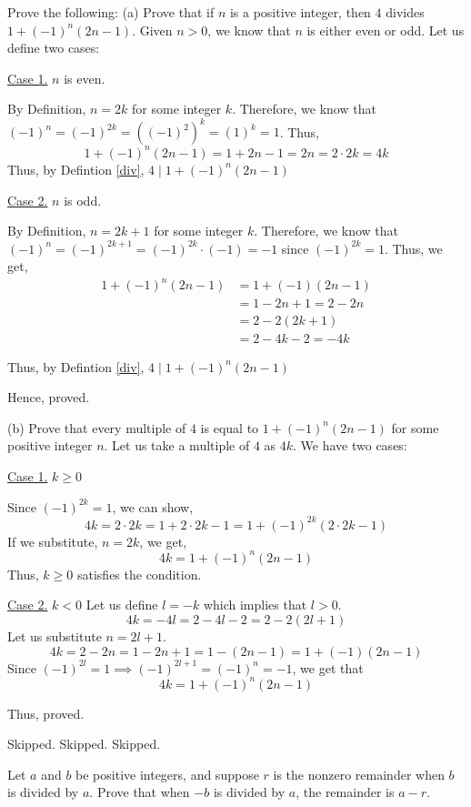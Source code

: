 \bp 
	Prove the following:
	\bigbreak
	(a) Prove that if $n$ is a positive integer, then $4$ divides $1 + (-1)^n(2n-1)$.
	\bs
		Given $n > 0$, we know that $n$ is either even or odd. Let us define two cases:

		\underline{Case 1.} $n$ is even.

		By Definition, $n = 2k$ for some integer $k$. 
		Therefore, we know that $(-1)^n = (-1)^{2k} = ((-1)^2)^k = (1)^k = 1$. Thus, 
		$$1 + (-1)^n(2n-1) = 1 + 2n-1 = 2n = 2 \cdot 2k = 4k$$
		Thus, by Defintion \ref{div}, $4 \mid 1 + (-1)^n(2n-1)$
		
		\underline{Case 2.} $n$ is odd.

		By Definition, $n = 2k+1$ for some integer $k$. 
		Therefore, we know that $(-1)^n = (-1)^{2k+1} = (-1)^{2k} \cdot (-1) = -1$ since $(-1)^{2k} = 1$.
		Thus, we get,
		\begin{align}
			1 + (-1)^n(2n-1) &= 1 + (-1)(2n-1) \\
											 &= 1 - 2n + 1 = 2 - 2n \\
											 &= 2 - 2(2k+1) \\
											 &= 2 - 4k - 2 = -4k
		\end{align}

		Thus, by Defintion \ref{div}, $4 \mid 1 + (-1)^n(2n-1)$


		Hence, proved.
	\es

	(b) Prove that every multiple of $4$ is equal to $1 + (-1)^n(2n-1)$ for some positive integer $n$.
	\bs
		Let us take a multiple of $4$ as $4k$. We have two cases:
		
		\underline{Case 1.} $k \geq 0$

		Since $(-1)^{2k} = 1$, we can show,
		$$4k = 2 \cdot 2k = 1 + 2 \cdot 2k - 1 = 1 + (-1)^{2k}(2 \cdot 2k - 1)$$
		If we substitute, $n = 2k$, we get, 
		$$4k = 1 + (-1)^n(2n-1)$$
		Thus, $k \geq 0$ satisfies the condition.

		\underline{Case 2.} $k < 0$
		Let us define $l = -k$ which implies that $l > 0$.
		$$4k = -4l =  2 - 4l - 2 = 2 - 2(2l+1)$$
		Let us substitute $n = 2l+1$.
		$$4k = 2 - 2n = 1 - 2n + 1 = 1 - (2n-1) = 1 + (-1)(2n-1)$$
		Since $(-1)^{2l} = 1 \implies (-1)^{2l+1} = (-1)^n = -1$, we get that
		$$4k = 1 + (-1)^n(2n-1)$$

		Thus, proved.
	\es
\ep 


\bp Skipped.\ep 
\bp Skipped.\ep 
\bp Skipped.\ep 

\bp 
	Let $a$ and $b$ be positive integers, and suppose $r$ is the nonzero remainder when $b$ is divided by $a$. Prove that when $-b$ is divided by $a$, the remainder is $a-r$.
\ep 

